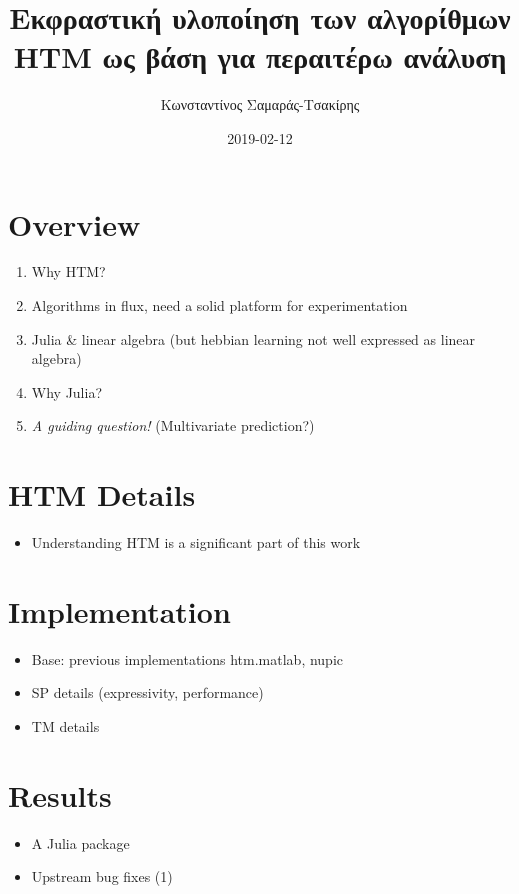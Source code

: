\documentclass[a4paper,10pt]{article}
\title{Εκφραστική υλοποίηση των αλγορίθμων HTM ως βάση για περαιτέρω ανάλυση}
\author{Κωνσταντίνος Σαμαράς-Τσακίρης}
\date{2019-02-12}
\begin{document}
\maketitle

\section{Overview}
\begin{enumerate}
  \item Why HTM?
  \item Algorithms in flux, need a solid platform for experimentation
  \item Julia \& linear algebra (but hebbian learning not well expressed as linear algebra)
  \item Why Julia?
  \item \textit{A guiding question!} (Multivariate prediction?)
\end{enumerate}

\section{HTM Details}
\begin{itemize}
  \item Understanding HTM is a significant part of this work
\end{itemize}

\section{Implementation}
\begin{itemize}
  \item Base: previous implementations {htm.matlab, nupic}
  \item SP details (expressivity, performance)
  \item TM details
\end{itemize}

\section{Results}
\begin{itemize}
  \item A Julia package
  \item Upstream bug fixes (1)
\end{itemize}
\end{document}
